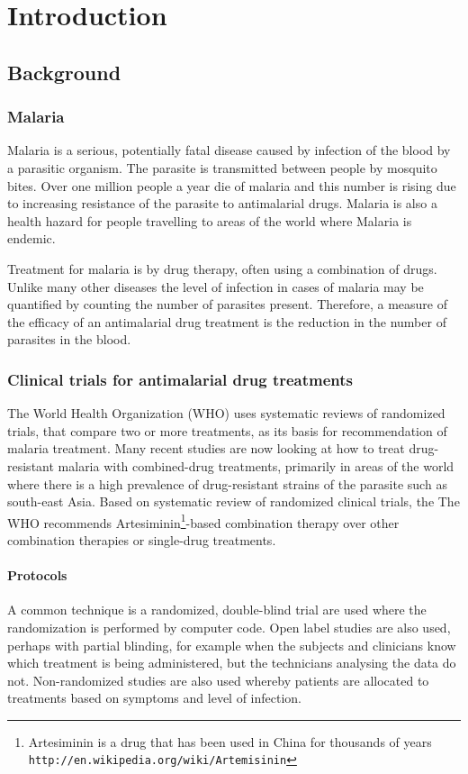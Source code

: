 \chapter{Introduction}\label{intro}
\section{Background}
\subsection{Malaria}
Malaria is a serious, potentially fatal disease caused by infection of the blood by a parasitic organism. The parasite is transmitted between people by mosquito bites. Over one million people a year die of malaria and this number is rising due to increasing resistance of the parasite to antimalarial drugs\cite{who}. Malaria is also a health hazard for people travelling to areas of the world where Malaria is endemic.

Treatment for malaria is by drug therapy, often using a combination of drugs. Unlike many other diseases the level of infection in cases of malaria may be quantified by counting the number of parasites present\cite{white}. Therefore, a measure of the efficacy of an antimalarial drug treatment is the reduction in the number of parasites in the blood. 

\subsection{Clinical trials for antimalarial drug treatments}
The World Health Organization (WHO) uses systematic reviews of randomized trials, that compare two or more treatments, as its basis for recommendation of malaria treatment\cite{who}. Many recent studies are now looking at how to treat drug-resistant malaria with combined-drug treatments, primarily in areas of the world where there is a high prevalence of drug-resistant strains of the parasite such as south-east Asia\cite{smithuis}. Based on systematic review of randomized clinical trials, the The WHO recommends Artesiminin\footnote{Artesiminin is a drug that has been used in China for thousands of years \texttt{http://en.wikipedia.org/wiki/Artemisinin}}-based combination therapy over other combination therapies or single-drug treatments\cite{who}. 

\subsubsection*{Protocols}
A common technique is a randomized, double-blind trial are used where the randomization is performed by computer code\cite{bell, newton, vries}. Open label studies are also used\cite{wootton, smithuis}, perhaps with partial blinding, for example when the subjects and clinicians know which treatment is being administered, but the technicians analysing the data do not\cite{wootton}. Non-randomized studies are also used whereby patients are allocated to treatments based on symptoms and level of infection\cite{carmello}.

